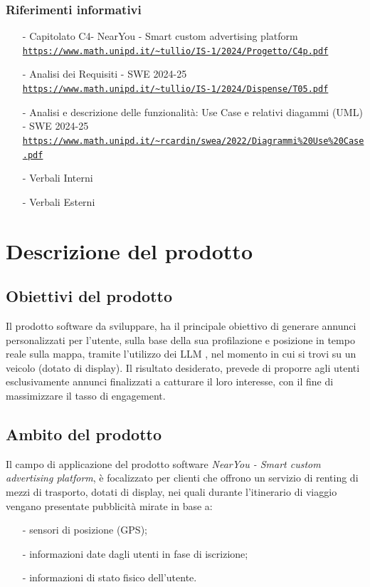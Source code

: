 \documentclass[11pt]{article}
\begin{document}
\begin{justify}
\begin{itemize}
\end{itemize}
\subsubsection{Riferimenti informativi}
\begin{itemize}
    \item[-] Capitolato C4- NearYou - 
Smart custom advertising platform\\
    \textcolor{blue}{\texttt{\url{https://www.math.unipd.it/~tullio/IS-1/2024/Progetto/C4p.pdf}}}
    \item[-] Analisi dei Requisiti - SWE 2024-25\\
    \textcolor{blue}{\texttt{\url{https://www.math.unipd.it/~tullio/IS-1/2024/Dispense/T05.pdf}}}
    \item[-] Analisi e descrizione delle funzionalità: Use Case e relativi diagammi (UML) - SWE 2024-25\\    
    \textcolor{blue}{\texttt{\url{https://www.math.unipd.it/~rcardin/swea/2022/Diagrammi\%20Use\%20Case.pdf}}}
    \item[-] Verbali Interni
    \item[-] Verbali Esterni
    
\end{itemize}

\newpage
\section{Descrizione del prodotto}
\label{sec:descrizione}
\subsection{Obiettivi del prodotto}

Il prodotto software da sviluppare, ha il principale obiettivo di generare annunci personalizzati per l'utente, sulla base della sua profilazione e posizione in tempo reale sulla mappa, tramite l'utilizzo dei LLM , nel momento in cui si trovi su un veicolo (dotato di display). Il risultato desiderato, prevede di proporre agli utenti esclusivamente annunci finalizzati a catturare il loro interesse, con il fine di massimizzare il tasso di engagement.
\subsection{Ambito del prodotto}
Il campo di applicazione del prodotto software \textit{NearYou - 
Smart custom advertising platform}, è focalizzato per clienti che offrono un servizio di renting di mezzi di trasporto, dotati di display, nei quali durante l'itinerario di viaggio vengano presentate pubblicità mirate in base a:
\begin{itemize}
    \item [-] sensori di posizione (GPS);
    \item [-] informazioni date dagli utenti in fase di iscrizione;
    \item [-] informazioni di stato fisico dell’utente.
\end{itemize}


\end{justify}
\end{document}
